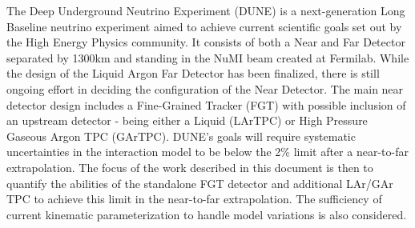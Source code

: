 \documentclass[12pt]{article}
\begin{document}
The Deep Underground Neutrino Experiment (DUNE) is a next-generation Long Baseline neutrino experiment aimed to achieve current scientific goals set out by the High Energy Physics community. It consists of both a Near and Far Detector separated by 1300km and standing in the NuMI beam created at Fermilab\cite{DUNE_CDR1}. While the design of the Liquid Argon Far Detector has been finalized, there is still ongoing effort in deciding the configuration of the Near Detector. The main near detector design includes a Fine-Grained Tracker (FGT) with possible inclusion of an upstream detector - being either a Liquid (LArTPC) or High Pressure Gaseous Argon TPC (GArTPC). DUNE's goals will require systematic uncertainties in the interaction model to be below the 2\% limit after a near-to-far extrapolation\cite{DUNE_review}.  The focus of the work described in this document is then to quantify the abilities of the standalone FGT detector and additional LAr/GAr TPC to achieve this limit in the near-to-far extrapolation. The sufficiency of current kinematic parameterization to handle model variations is also considered. 
\end{document}
